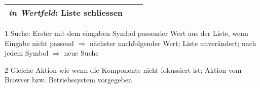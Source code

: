 \begin{table}[!htb]
\begin{threeparttable}
\begin{tabular}{ l || l | l }
{                                                  \textit{in Wertfeld}: Liste schliessen} \\
            \hline
        \end{tabular}
        \begin{tablenotes}
            \scriptsize
            \item[1] Suche: Erster mit dem eingaben Symbol passender Wert aus der Liste, wenn Eingabe nicht passend $\Rightarrow$ nächster nachfolgender Wert; 
                            Liste unverändert; nach jedem Symbol $\Rightarrow$ neue Suche
            \item[2] Gleiche Aktion wie wenn die Komponente nicht fokussiert ist; Aktion vom Browser bzw. Betriebssystem vorgegeben
        \end{tablenotes}
    \end{threeparttable}
\end{table}
